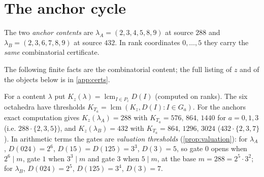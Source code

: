 \section{The anchor cycle}
The two \emph{anchor contents} are $\lambda_A=(2,3,4,5,8,9)$ at source $288$ and $\lambda_B=(2,3,6,7,8,9)$ at source $432$. In rank coordinates $0,\dots,5$ they carry the \emph{same} combinatorial certificate.
The following finite facts are the combinatorial content; the full listing of $z$ and of the objects below is in \cref{app:certs}.
For a content $\lambda$ put $K_z(\lambda)=\operatorname{lcm}_{I\in P_z}D(I)$ (computed on ranks). The six octahedra have thresholds $K_{T_a}=\operatorname{lcm}(K_z,D(I):I\in G_a)$. For the anchors exact computation gives $K_z(\lambda_A)=288$ with $K_{T_a}=576,\,864,\,1440$ for $a=0,1,3$ (i.e. $288\cdot\{2,3,5\}$), and $K_z(\lambda_B)=432$ with $K_{T_a}=864,\,1296,\,3024$ ($432\cdot\{2,3,7\}$). In arithmetic terms the gates are \emph{valuation thresholds} (\cref{prop:valuation}): for $\lambda_A$, $D(024)=2^6$, $D(15)=D(125)=3^3$, $D(3)=5$, so gate $0$ opens when $2^6\mid m$, gate $1$ when $3^3\mid m$ and gate $3$ when $5\mid m$, at the base $m=288=2^5\cdot3^2$; for $\lambda_B$, $D(024)=2^5$, $D(125)=3^4$, $D(3)=7$.

